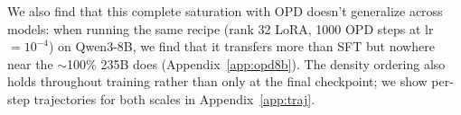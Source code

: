 \documentclass{article}
\begin{document}

We also find that this complete saturation with OPD doesn't generalize across models: when running the same recipe (rank 32 LoRA, 1000 OPD steps at lr${=}10^{-4}$) on Qwen3-8B, we find that it transfers more than SFT but nowhere near the $\sim$100\% 235B does (Appendix~\ref{app:opd8b}). The density ordering also holds throughout training rather than only at the final checkpoint; we show per-step trajectories for both scales in Appendix~\ref{app:traj}.


\end{document}
